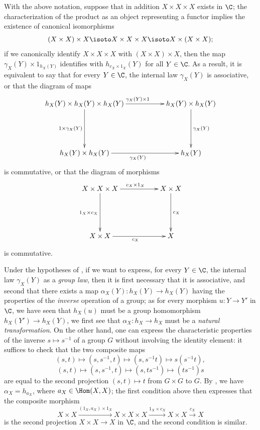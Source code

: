 \begin{env}[8.2.5]
\label{0.8.2.5}
With the above notation, suppose that in addition $X\times X\times X$ exists in $\C$; the characterization of the product as an object representing a functor  implies the existence of canonical isomorphisms
\[
  (X\times X)\times X\isoto X\times X\times X\isoto X\times(X\times X);
\]
if we canonically identify $X\times X\times X$ with $(X\times X)\times X$, then the map $\gamma_X(Y)\times 1_{h_X(Y)}$ identifies with $h_{c_X\times 1_X}(Y)$ for all $Y\in\C$.
As a result, it is equivalent to say that for every $Y\in\C$, the internal law $\gamma_X(Y)$ is associative, or that the diagram of maps
\[
  \xymatrix{
    h_X(Y)\times h_X(Y)\times h_X(Y)\ar[rr]^{\gamma_X(Y)\times 1}\ar[dd]_{1\times\gamma_X(Y)} & &
    h_X(Y)\times h_X(Y)\ar[dd]^{\gamma_X(Y)}\\\\
    h_X(Y)\times h_X(Y)\ar[rr]_{\gamma_X(Y)} & &
    h_X(Y)
  }
\]
is commutative, or that the diagram of morphisms
\[
  \xymatrix{
    X\times X\times X\ar[rr]^{c_X\times 1_X}\ar[dd]_{1_X\times c_X} & &
    X\times X\ar[dd]^{c_X}\\\\
    X\times X\ar[rr]_{c_X} & &
    X
  }
\]
is commutative.
\end{env}

\begin{env}[8.2.6]
\label{0.8.2.6}
Under the hypotheses of , if we want to express, for every $Y\in\C$, the internal law $\gamma_X(Y)$ as a \emph{group law}, then it is first necessary that it is associative, and second that there exists a map $\alpha_X(Y):h_X(Y)\to h_X(Y)$ having the properties of the \emph{inverse} operation of a group; as for every morphism $u:Y\to Y'$ in $\C$, we have seen that $h_X(u)$ must be a group homomorphism $h_X(Y')\to h_X(Y)$, we first see that $\alpha_X:h_X\to h_X$ must be a \emph{natural transformation}.
On the other hand, one can express the characteristic properties of the inverse $s\mapsto s^{-1}$ of a group $G$ without involving the identity element: it suffices to check that the two composite maps
\[
  (s,t)\mapsto(s,s^{-1},t)\mapsto(s,s^{-1}t)\mapsto s(s^{-1}t),
\]
\[
  (s,t)\mapsto(s,s^{-1},t)\mapsto(s,ts^{-1})\mapsto(ts^{-1})s
\]
are equal to the second projection $(s,t)\mapsto t$ from $G\times G$ to $G$.
By , we have $\alpha_X=h_{a_X}$, where $a_X\in\Hom(X,X)$; the first condition above then expresses that the composite morphism
\[
  X\times X\xrightarrow{(1_X,a_X)\times 1_X}X\times X\times X\xrightarrow{1_X\times c_X}X\times X\xrightarrow{c_X}X
\]
is the second projection $X\times X\to X$ in $\C$, and the second condition is similar.
\end{env}

